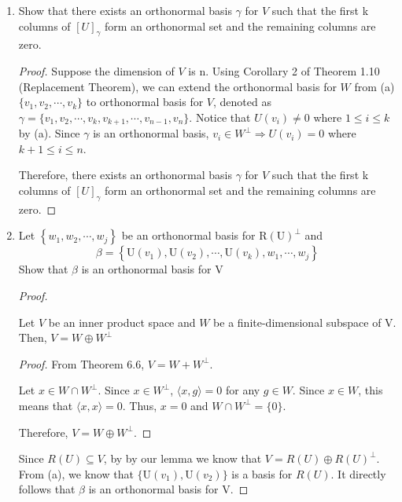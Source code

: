 \documentclass[11pt]{scrartcl}
\begin{document}
\begin{enumerate}[label=\alph*.]
{	      }
	\item{
	      Show that there exists an orthonormal basis $\gamma$ for $V$ such that the first k
	      columns of $[U]_\gamma$ form an orthonormal set and the remaining columns are zero.
	      \begin{proof}
		      Suppose the dimension of $V$ is n.
		      Using Corollary 2 of Theorem 1.10 (Replacement Theorem), we can extend
		      the orthonormal basis for $W$ from (a) $\{v_1, v_2, \cdots , v_k\}$ to
		      orthonormal basis for $V$, denoted as
		      $\gamma = \{v_1, v_2, \cdots ,v_k, v_{k+1}, \cdots, v_{n-1}, v_n\}$.
		      Notice that $U(v_i) \neq 0$ where $1 \leq i \leq k$ by (a). Since
		      $\gamma$ is an orthonormal basis, $v_i \in W^\perp \Rightarrow U(v_i) = 0$ where $k+1 \leq i \leq n$.\par
		      Therefore, there exists an orthonormal basis $\gamma$ for $V$ such that the first k
		      columns of $[U]_\gamma$ form an orthonormal set and the remaining columns are zero.
	      \end{proof}
	      }
	\item{
	      Let $\left\{w_{1}, w_{2}, \cdots, w_{j}\right\}$ be an orthonormal basis for $\mathrm{R}(\mathrm{U})^{\perp}$ and
	      $$
		      \beta=\left\{\mathrm{U}\left(v_{1}\right), \mathrm{U}\left(v_{2}\right), \cdots, \mathrm{U}\left(v_{k}\right), w_{1}, \cdots, w_{j}\right\}
	      $$
	      Show that $\beta$ is an orthonormal basis for $\mathrm{V}$
	      \begin{proof}\
		      \begin{lemma}
			      Let $V$ be an inner product space and $W$ be a finite-dimensional subspace of V.
			      Then, $V = W \oplus W^\perp$
			      \begin{proof}
				      From Theorem 6.6, $V = W + W^\perp$. \par
				      Let $x \in W \cap W^\perp$. Since $x \in W^\perp$, $\langle x, g \rangle = 0$ for any $g \in W$.
				      Since $x \in W$, this means that $\langle x, x \rangle = 0$. Thus, $x = 0$ and $ W \cap W^\perp = \{0\}$.\par
				      Therefore, $V = W \oplus W^\perp$.
			      \end{proof}
		      \end{lemma}
		      Since $R(U) \subseteq V$, by by our lemma we know that $V = R(U) \oplus R(U)^\perp$.
		      From (a), we know that
		      $\{\mathrm{U}\left(v_{1}\right), \mathrm{U}\left(v_{2}\right)\}$ is a basis for $R(U)$.
		      It directly follows that $\beta$ is an orthonormal basis for $\mathrm{V}$.

\end{proof}}
\end{enumerate}
\end{document}
